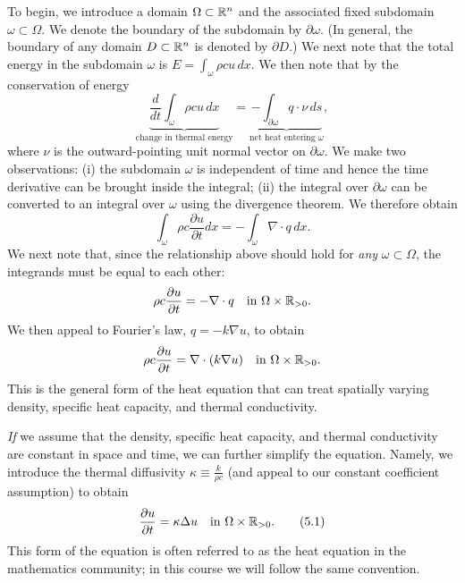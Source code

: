 To begin, we introduce a domain $\Omega \subset \mathbb{R}^n$ and the associated fixed subdomain $\omega \subset \Omega$. We denote the boundary of the subdomain by $\partial\omega$. (In general, the boundary of any domain $D \subset \mathbb{R}^n$ is denoted by $\partial D$.) We next note that the total energy in the subdomain $\omega$ is $E = \int_\omega \rho c u\,dx$. We then note that by the conservation of energy
\[\underbrace{\frac{d}{dt} \int_\omega \rho c u\,dx}_{\text{change in thermal energy}} = \underbrace{-\int_{\partial\omega} q \cdot \nu\,ds}_{\text{net heat entering } \omega},\]
where $\nu$ is the outward-pointing unit normal vector on $\partial\omega$. We make two observations: (i) the subdomain $\omega$ is independent of time and hence the time derivative can be brought inside the integral; (ii) the integral over $\partial\omega$ can be converted to an integral over $\omega$ using the divergence theorem. We therefore obtain
\[\int_\omega \rho c \frac{\partial u}{\partial t} dx = -\int_\omega \nabla \cdot q\,dx.\]
We next note that, since the relationship above should hold for \textit{any} $\omega \subset \Omega$, the integrands must be equal to each other:
\[\rho c \frac{\partial u}{\partial t} = -\nabla \cdot q \quad \text{in } \Omega \times \mathbb{R}_{>0}.\]
We then appeal to Fourier's law, $q = -k \nabla u$, to obtain
\[\rho c \frac{\partial u}{\partial t} = \nabla \cdot (k \nabla u) \quad \text{in } \Omega \times \mathbb{R}_{>0}.\]
This is the general form of the heat equation that can treat spatially varying density, specific heat capacity, and thermal conductivity.

\textit{If} we assume that the density, specific heat capacity, and thermal conductivity are constant in space and time, we can further simplify the equation. Namely, we introduce the thermal diffusivity $\kappa \equiv \frac{k}{\rho c}$ (and appeal to our constant coefficient assumption) to obtain
\begin{equation*}
    \frac{\partial u}{\partial t} = \kappa \Delta u \quad \text{in } \Omega \times \mathbb{R}_{>0}. \tag{5.1}
\end{equation*}
This form of the equation is often referred to as the heat equation in the mathematics community; in this course we will follow the same convention.

